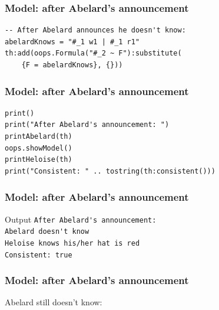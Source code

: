 \documentclass{beamer}
\begin{document}
\begin{frame}[fragile]
\frametitle{Model: after Abelard's announcement}
\begin{lstlisting}
-- After Abelard announces he doesn't know:
abelardKnows = "#_1 w1 | #_1 r1"
th:add(oops.Formula("#_2 ~ F"):substitute(
    {F = abelardKnows}, {}))
\end{lstlisting}
\end{frame}

\begin{frame}[fragile]
\frametitle{Model: after Abelard's announcement}
\begin{lstlisting}
print()
print("After Abelard's announcement: ")
printAbelard(th)
oops.showModel()
printHeloise(th)
print("Consistent: " .. tostring(th:consistent()))
\end{lstlisting}
\end{frame}

\begin{frame}[fragile]
\frametitle{Model: after Abelard's announcement}
\begin{block}{Output}
\verb!After Abelard's announcement:! \\
\verb!Abelard doesn't know! \\
\verb!Heloise knows his/her hat is red! \\
\verb!Consistent: true!
\end{block}
\end{frame}

\begin{frame}
\frametitle{Model: after Abelard's announcement}
Abelard still doesn't know:
\end{frame}
\end{document}

